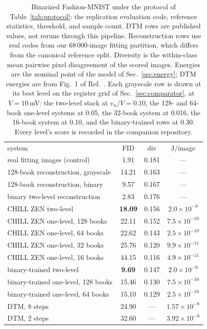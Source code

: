 \documentclass[reprint,amsmath,amssymb,aps,nofootinbib]{revtex4-2}
\begin{document}
\begin{table}
\caption{Binarized Fashion-MNIST under the protocol of
Table~\ref{tab:protocol}: the replication
evaluation code, reference statistics, threshold, and sample count.
DTM rows are published values, not reruns through this pipeline.
Reconstruction rows use real codes from our 68\,000-image fitting
partition, which differs from the canonical reference split. Diversity is the within-class
mean pairwise pixel disagreement of the scored images. Energies are
the nominal point of the model of Sec.~\ref{sec:energy}; DTM
energies are from Fig.~1 of Ref.~\cite{jelincic2025dtm}. Each grayscale
row is drawn at its best level on the register grid of
Sec.~\ref{sec:comparator}, at $V = 10$\,mV: the two-level stack at
$v_n / V = 0.10$, the 128- and 64-book one-level systems at 0.05, the
32-book system at 0.016, the 16-book system at 0.10, and the
binary-trained rows at 0.30. Every level's score is recorded in the
companion repository.
\label{tab:headtohead}}
\begin{ruledtabular}
\footnotesize
\begin{tabular}{lccc}
system & FID & div & J/image \\
\colrule
real fitting images (control) & 1.91 & 0.181 & --- \\
128-book reconstruction, grayscale & 14.21 & 0.163 & --- \\
128-book reconstruction, binary & 9.57 & 0.167 & --- \\
binary two-level reconstruction & 2.83 & 0.176 & --- \\
\colrule
CHILL ZEN two-level & \textbf{18.09} & 0.156 & $2.0\times10^{-9}$ \\
CHILL ZEN one-level, 128 books & 22.11 & 0.152 & $7.5\times10^{-10}$ \\
CHILL ZEN one-level, 64 books & 22.62 & 0.143 & $2.5\times10^{-10}$ \\
CHILL ZEN one-level, 32 books & 25.76 & 0.120 & $9.9\times10^{-11}$ \\
CHILL ZEN one-level, 16 books & 44.15 & 0.116 & $4.9\times10^{-11}$ \\
\colrule
binary-trained two-level & \textbf{9.69} & 0.147 & $2.0\times10^{-9}$ \\
binary-trained one-level, 128 books & 15.46 & 0.130 & $7.5\times10^{-10}$ \\
binary-trained one-level, 64 books & 15.10 & 0.129 & $2.5\times10^{-10}$ \\
\colrule
DTM, 8 steps \cite{jelincic2025dtm} & 24.90 & --- & $1.57\times10^{-8}$ \\
DTM, 2 steps \cite{jelincic2025dtm} & 32.60 & --- & $3.92\times10^{-9}$ \\
\end{tabular}
\end{ruledtabular}
\end{table}
\end{document}
